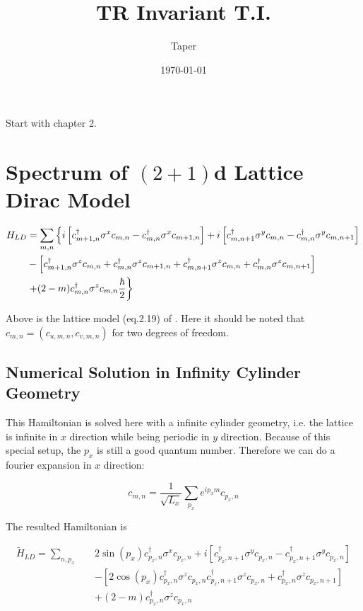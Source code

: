 \documentclass{article}
\title{TR Invariant T.I.}
\date{\today}
\author{Taper}
\begin{document}
\maketitle
{}
\tableofcontents
Start with chapter 2.

\section{Spectrum of \texorpdfstring{$(2+1)$}-d Lattice Dirac Model}
\label{sec:2+1d-LDirac Model}
\begin{align}
    H_{LD} &= \sum_{m,n}\left\{
        i \left[ c^\dagger_{m+1,n}\sigma^x c_{m,n}
            - c^\dagger_{m,n}\sigma^x c_{m+1,n}\right]
        + i \left[ c^\dagger_{m,n+1}\sigma^y c_{m,n}
            - c^\dagger_{m,n}\sigma^y c_{m,n+1} \right]
        \right.
        \nonumber\\
        &- \left[
            c^\dagger_{m+1,n}\sigma^z c_{m,n}
            + c^\dagger_{m,n}\sigma^z c_{m+1,n}
            + c^\dagger_{m,n+1}\sigma^z c_{m,n}
            + c^\dagger_{m,n}\sigma^z c_{m,n+1}
        \right]
        \nonumber\\
        & \left. + (2-m) c^\dagger_{m,n}\sigma^z c_{m,n}
        \vphantom{xx}\frac\hbar2
    \right\}
\end{align}

Above is the lattice model (eq.2.19) of \cite{Hughes2009}. Here it
should be noted that $c_{m,n}=(c_{u,m,n}, c_{v,m,n})$ for two degrees
of freedom. 

\subsection{Numerical Solution in Infinity Cylinder Geometry}
\label{sec:Numerical Solution in Infinity Cylinder Geometry}

This Hamiltonian is solved here with a infinite cylinder geometry, i.e.
the lattice is infinite in $x$ direction while being periodic in $y$
direction. Because of this special setup, the $p_x$ is still a good
quantum number. Therefore we can do a fourier expansion in $x$
direction:

\begin{equation}
    c_{m,n} = \frac{1}{\sqrt{L_x}} \sum_{p_x} e^{ip_x m} c_{p_x,n}
\end{equation}

The resulted Hamiltonian is 

\begin{align}
    \tilde H_{LD} = \sum_{n,p_x}\quad &
    2\sin(p_x) c^\dagger_{p_x,n}\sigma^x c_{p_x,n}
    +i \left[ c^\dagger_{p_x,n+1}\sigma^y c_{p_x,n} - 
        c^\dagger_{p_x,n+1}\sigma^y c_{p_x,n}\right]
    \nonumber\\
    &- \left[ 2\cos(p_x) c^\dagger_{p_x,n}\sigma^z c_{p_x,n}
        c^\dagger_{p_x,n+1}\sigma^z c_{p_x,n}
        + c^\dagger_{p_x,n}\sigma^z c_{p_x,n+1}
    \right]
    \nonumber\\
    &+ (2-m) c^\dagger_{p_x,n}\sigma^z c_{p_x,n}
\end{align}
\end{document}
